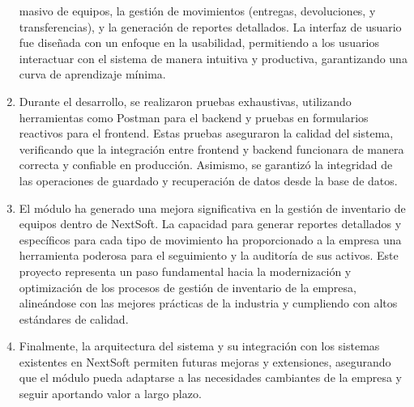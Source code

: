 \documentclass[stu, 12pt, letterpaper, donotrepeattitle, floatsintext, natbib]{apa7}
\begin{document}
\begin{enumerate}
          masivo de equipos, la gestión de movimientos (entregas, devoluciones, y transferencias), y la generación de reportes detallados. La
          interfaz de usuario fue diseñada con un enfoque en la usabilidad, permitiendo a los usuarios interactuar con el sistema de manera
          intuitiva y productiva, garantizando una curva de aprendizaje mínima.
    \item %
          Durante el desarrollo, se realizaron pruebas exhaustivas, utilizando herramientas como Postman para el backend y pruebas en formularios
          reactivos para el frontend. Estas pruebas aseguraron la calidad del sistema, verificando que la integración entre frontend y backend
          funcionara de manera correcta y confiable en producción. Asimismo, se garantizó la integridad de las operaciones de guardado y
          recuperación de datos desde la base de datos.
    \item %
          El módulo ha generado una mejora significativa en la gestión de inventario de equipos dentro de NextSoft. La capacidad para generar
          reportes detallados y específicos para cada tipo de movimiento ha proporcionado a la empresa una herramienta poderosa para el
          seguimiento y la auditoría de sus activos. Este proyecto representa un paso fundamental hacia la modernización y optimización de los
          procesos de gestión de inventario de la empresa, alineándose con las mejores prácticas de la industria y cumpliendo con altos
          estándares de calidad.
    \item %
          Finalmente, la arquitectura del sistema y su integración con los sistemas existentes en NextSoft permiten futuras mejoras y extensiones,
          asegurando que el módulo pueda adaptarse a las necesidades cambiantes de la empresa y seguir aportando valor a largo plazo.
\end{enumerate}
\newpage
\end{document}
